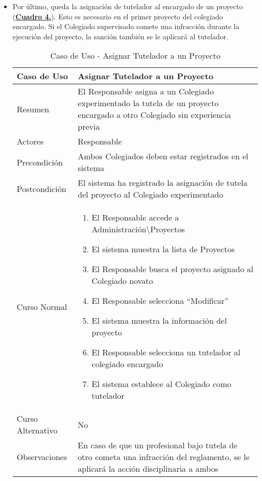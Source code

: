 \begin{itemize}
  \newpage~
	\item \addtocounter{tabla}{1} Por último, queda la asignación de tutelador al encargado de un proyecto (\textbf{\hyperref[tab:curAsignarTutela]{Cuadro 4.}}). Esto es necesario en el primer proyecto del colegiado encargado. Si el Colegiado supervisado comete una infracción durante la ejecución del proyecto, la sanción también se le aplicará al tutelador.
		\begin{table}[!htbp]
		  \centering \addtocounter{casouso}{1}
		  \begin{tabular}{|l | p{100mm}|}
		    \textbf{Caso de Uso}  & \textbf{Asignar Tutelador a un Proyecto} \\ \hline
		    Resumen 		 & El Responsable asigna a un Colegiado experimentado la tutela de un proyecto encargado a otro Colegiado sin experiencia previa \\ \hline
		    Actores  		 & Responsable \\ \hline
		    Precondición  	 & Ambos Colegiados deben estar registrados en el sistema \\ \hline
		    Postcondición  	 & El sistema ha registrado la asignación de tutela del proyecto al Colegiado experimentado \\ \hline
		    Curso Normal   	 & \begin{enumerate}
			  \item El Responsable accede a Administración\textbackslash Proyectos
			  \item El sistema muestra la lista de Proyectos
			  \item El Responsable busca el proyecto asignado al Colegiado novato
			  \item El Responsable selecciona ``Modificar''
			  \item El sistema muestra la información del proyecto
			  \item El Responsable selecciona un tutelador al colegiado encargado
			  \item El sistema establece al Colegiado como tutelador
		    \end{enumerate}  \\ \hline
		    Curso Alternativo  & No  \\ \hline
		    Observaciones 	 & En caso de que un profesional bajo tutela de otro cometa una infracción del reglamento, se le aplicará la acción disciplinaria a ambos  \\ \hline
		  \end{tabular}
		  \caption{Caso de Uso  - Asignar Tutelador a un Proyecto}
		  \label{tab:curAsignarTutela}
		\end{table}
		\FloatBarrier
\end{itemize}



